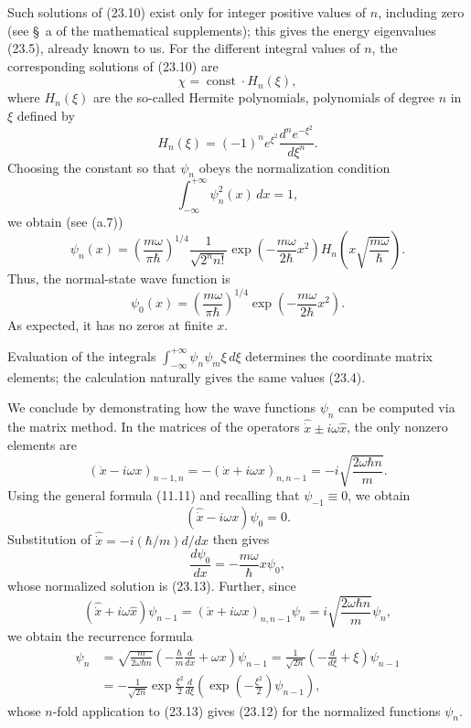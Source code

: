 Such solutions of (23.10) exist only for integer positive values of $n$,
including zero (see \S~a of the mathematical supplements); this gives the
energy eigenvalues (23.5), already known to us. For the different integral
values of $n$, the corresponding solutions of (23.10) are
\[
  \chi=\operatorname{const}\cdot H_n(\xi),
\]
where $H_n(\xi)$ are the so-called Hermite polynomials, polynomials of degree
$n$ in $\xi$ defined by
\begin{equation}
  H_n(\xi)=(-1)^ne^{\xi^2}\frac{d^ne^{-\xi^2}}{d\xi^n}.
  \tag{23.11}
\end{equation}
Choosing the constant so that $\psi_n$ obeys the normalization condition
\[
  \int_{-\infty}^{+\infty}\psi_n^2(x)\,dx=1,
\]
we obtain (see (a.7))
\begin{equation}
  \psi_n(x)=\left(\frac{m\omega}{\pi\hbar}\right)^{1/4}
  \frac{1}{\sqrt{2^nn!}}
  \exp\left(-\frac{m\omega}{2\hbar}x^2\right)
  H_n\left(x\sqrt{\frac{m\omega}{\hbar}}\right).
  \tag{23.12}
\end{equation}
Thus, the normal-state wave function is
\begin{equation}
  \psi_0(x)=\left(\frac{m\omega}{\pi\hbar}\right)^{1/4}
  \exp\left(-\frac{m\omega}{2\hbar}x^2\right).
  \tag{23.13}
\end{equation}
As expected, it has no zeros at finite $x$.

Evaluation of the integrals
$\int_{-\infty}^{+\infty}\psi_n\psi_m\xi\,d\xi$ determines the coordinate
matrix elements; the calculation naturally gives the same values (23.4).

We conclude by demonstrating how the wave functions $\psi_n$ can be computed
via the matrix method. In the matrices of the operators
$\hat{\dot x}\pm i\omega\hat x$, the only nonzero elements are
\begin{equation}
  (\dot x-i\omega x)_{n-1,n}=-(\dot x+i\omega x)_{n,n-1}
  =-i\sqrt{\frac{2\omega\hbar n}{m}}.
  \tag{23.14}
\end{equation}
Using the general formula (11.11) and recalling that $\psi_{-1}\equiv0$, we
obtain
\[
  (\hat{\dot x}-i\omega x)\psi_0=0.
\]
Substitution of $\hat{\dot x}=-i(\hbar/m)d/dx$ then gives
\[
  \frac{d\psi_0}{dx}=-\frac{m\omega}{\hbar}x\psi_0,
\]
whose normalized solution is (23.13). Further, since
\[
  (\hat{\dot x}+i\omega\hat x)\psi_{n-1}
  =(\dot x+i\omega x)_{n,n-1}\psi_n
  =i\sqrt{\frac{2\omega\hbar n}{m}}\psi_n,
\]
we obtain the recurrence formula
\begin{align*}
  \psi_n&=\sqrt{\frac{m}{2\omega\hbar n}}
  \left(-\frac{\hbar}{m}\frac d{dx}+\omega x\right)\psi_{n-1}
  =\frac1{\sqrt{2n}}\left(-\frac d{d\xi}+\xi\right)\psi_{n-1}\\
  &=-\frac1{\sqrt{2n}}\exp\frac{\xi^2}{2}\frac d{d\xi}
  \left(\exp\left(-\frac{\xi^2}{2}\right)\psi_{n-1}\right),
\end{align*}
whose $n$-fold application to (23.13) gives (23.12) for the normalized
functions $\psi_n$.


